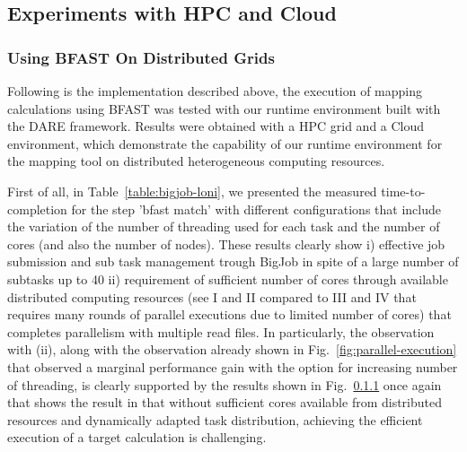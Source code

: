 \documentclass{acm_proc_article-sp}
\begin{document}
\subsection{Experiments with HPC and Cloud}

\subsubsection{Using BFAST On Distributed Grids}

Following is the implementation described above, the execution of
mapping calculations using BFAST was tested with our runtime
environment built with the DARE framework.  Results were obtained with
a HPC grid and a Cloud environment, which demonstrate the capability
of our runtime environment for the mapping tool on distributed
heterogeneous computing resources. 

First of all, in Table~\ref{table:bigjob-loni}, we presented the
measured time-to-completion for the step 'bfast match' with different
configurations that include the variation of the number of threading
used for each task and the number of cores (and also the number of
nodes).  These results clearly show i) effective job submission and
sub task management trough BigJob in spite of a large number of
subtasks up to 40 ii) requirement of sufficient number of cores
through available distributed computing resources (see I and II
compared to III and IV that requires many rounds of parallel
executions due to limited number of cores) that completes parallelism
with multiple read files.  In particularly, the observation with (ii),
along with the observation already shown in
Fig.~\ref{fig:parallel-execution} that observed a marginal performance
gain with the option for increasing number of threading, is clearly
supported by the results shown in Fig.~\ref{} once again that shows
the result in that without sufficient cores available from distributed
resources and dynamically adapted task distribution, achieving the
efficient execution of a target calculation is challenging.
\end{document}
